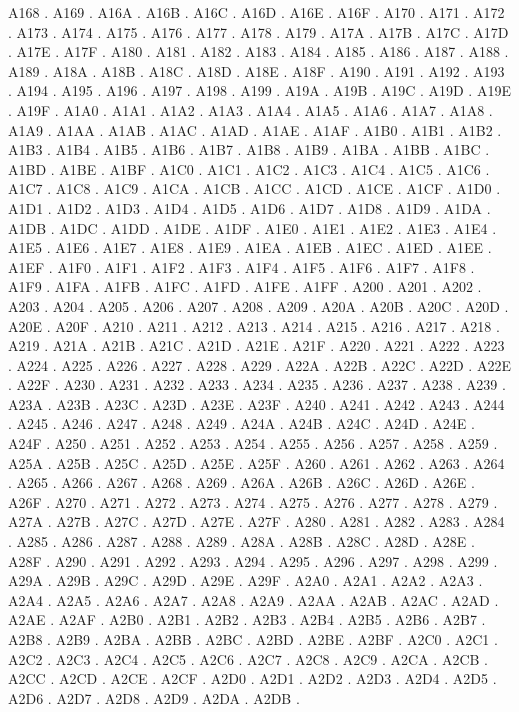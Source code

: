 A168 .
A169 .
A16A .
A16B .
A16C .
A16D .
A16E .
A16F .
A170 .
A171 .
A172 .
A173 .
A174 .
A175 .
A176 .
A177 .
A178 .
A179 .
A17A .
A17B .
A17C .
A17D .
A17E .
A17F .
A180 .
A181 .
A182 .
A183 .
A184 .
A185 .
A186 .
A187 .
A188 .
A189 .
A18A .
A18B .
A18C .
A18D .
A18E .
A18F .
A190 .
A191 .
A192 .
A193 .
A194 .
A195 .
A196 .
A197 .
A198 .
A199 .
A19A .
A19B .
A19C .
A19D .
A19E .
A19F .
A1A0 .
A1A1 .
A1A2 .
A1A3 .
A1A4 .
A1A5 .
A1A6 .
A1A7 .
A1A8 .
A1A9 .
A1AA .
A1AB .
A1AC .
A1AD .
A1AE .
A1AF .
A1B0 .
A1B1 .
A1B2 .
A1B3 .
A1B4 .
A1B5 .
A1B6 .
A1B7 .
A1B8 .
A1B9 .
A1BA .
A1BB .
A1BC .
A1BD .
A1BE .
A1BF .
A1C0 .
A1C1 .
A1C2 .
A1C3 .
A1C4 .
A1C5 .
A1C6 .
A1C7 .
A1C8 .
A1C9 .
A1CA .
A1CB .
A1CC .
A1CD .
A1CE .
A1CF .
A1D0 .
A1D1 .
A1D2 .
A1D3 .
A1D4 .
A1D5 .
A1D6 .
A1D7 .
A1D8 .
A1D9 .
A1DA .
A1DB .
A1DC .
A1DD .
A1DE .
A1DF .
A1E0 .
A1E1 .
A1E2 .
A1E3 .
A1E4 .
A1E5 .
A1E6 .
A1E7 .
A1E8 .
A1E9 .
A1EA .
A1EB .
A1EC .
A1ED .
A1EE .
A1EF .
A1F0 .
A1F1 .
A1F2 .
A1F3 .
A1F4 .
A1F5 .
A1F6 .
A1F7 .
A1F8 .
A1F9 .
A1FA .
A1FB .
A1FC .
A1FD .
A1FE .
A1FF .
A200 .
A201 .
A202 .
A203 .
A204 .
A205 .
A206 .
A207 .
A208 .
A209 .
A20A .
A20B .
A20C .
A20D .
A20E .
A20F .
A210 .
A211 .
A212 .
A213 .
A214 .
A215 .
A216 .
A217 .
A218 .
A219 .
A21A .
A21B .
A21C .
A21D .
A21E .
A21F .
A220 .
A221 .
A222 .
A223 .
A224 .
A225 .
A226 .
A227 .
A228 .
A229 .
A22A .
A22B .
A22C .
A22D .
A22E .
A22F .
A230 .
A231 .
A232 .
A233 .
A234 .
A235 .
A236 .
A237 .
A238 .
A239 .
A23A .
A23B .
A23C .
A23D .
A23E .
A23F .
A240 .
A241 .
A242 .
A243 .
A244 .
A245 .
A246 .
A247 .
A248 .
A249 .
A24A .
A24B .
A24C .
A24D .
A24E .
A24F .
A250 .
A251 .
A252 .
A253 .
A254 .
A255 .
A256 .
A257 .
A258 .
A259 .
A25A .
A25B .
A25C .
A25D .
A25E .
A25F .
A260 .
A261 .
A262 .
A263 .
A264 .
A265 .
A266 .
A267 .
A268 .
A269 .
A26A .
A26B .
A26C .
A26D .
A26E .
A26F .
A270 .
A271 .
A272 .
A273 .
A274 .
A275 .
A276 .
A277 .
A278 .
A279 .
A27A .
A27B .
A27C .
A27D .
A27E .
A27F .
A280 .
A281 .
A282 .
A283 .
A284 .
A285 .
A286 .
A287 .
A288 .
A289 .
A28A .
A28B .
A28C .
A28D .
A28E .
A28F .
A290 .
A291 .
A292 .
A293 .
A294 .
A295 .
A296 .
A297 .
A298 .
A299 .
A29A .
A29B .
A29C .
A29D .
A29E .
A29F .
A2A0 .
A2A1 .
A2A2 .
A2A3 .
A2A4 .
A2A5 .
A2A6 .
A2A7 .
A2A8 .
A2A9 .
A2AA .
A2AB .
A2AC .
A2AD .
A2AE .
A2AF .
A2B0 .
A2B1 .
A2B2 .
A2B3 .
A2B4 .
A2B5 .
A2B6 .
A2B7 .
A2B8 .
A2B9 .
A2BA .
A2BB .
A2BC .
A2BD .
A2BE .
A2BF .
A2C0 .
A2C1 .
A2C2 .
A2C3 .
A2C4 .
A2C5 .
A2C6 .
A2C7 .
A2C8 .
A2C9 .
A2CA .
A2CB .
A2CC .
A2CD .
A2CE .
A2CF .
A2D0 .
A2D1 .
A2D2 .
A2D3 .
A2D4 .
A2D5 .
A2D6 .
A2D7 .
A2D8 .
A2D9 .
A2DA .
A2DB .
